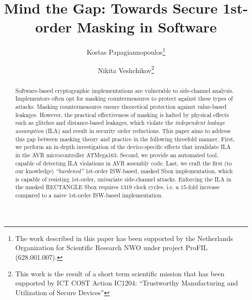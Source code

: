 \documentclass[runningheads, a4paper, 10pt]{llncs}
\begin{document}



\title{Mind the Gap: Towards Secure 1st-order Masking in Software}


\author{
Kostas Papagiannopoulos\thanks{The work described in this paper has been supported 
by the Netherlands Organization for Scientific Research NWO under project ProFIL (628.001.007).}
\and
Nikita Veshchikov\thanks{This work is the result of a short term scientific mission 
that has been supported by ICT COST Action IC1204:
``Trustworthy Manufacturing and Utilization of Secure Devices''}
}


\maketitle

\begin{abstract}
Software-based cryptographic implementations are vulnerable to side-channel analysis. 
Implementors often opt for masking countermeasures to protect against these types of attacks.
Masking countermeasures ensure theoretical protection against value-based leakages. However, the practical effectiveness of masking is halted by 
physical effects such as glitches and distance-based leakages, which violate the \emph{independent leakage assumption} (ILA) and result in security order reductions. This paper aims to address this gap between masking theory and practice in the following threefold manner. First, we perform an in-depth investigation of the device-specific effects that invalidate ILA in the AVR microcontroller ATMega163. Second, we provide an automated tool, capable of detecting ILA violations in AVR assembly code. Last, we craft the first (to our knowledge) \emph{``hardened''} 1st-order ISW-based, masked Sbox implementation, which is capable of resisting 1st-order, univariate side-channel attacks. Enforcing the ILA in the masked RECTANGLE Sbox requires $1319$ clock cycles, i.e. a $15$-fold increase compared  to a naive 1st-order ISW-based implementation. 


\end{abstract}
\end{document}
